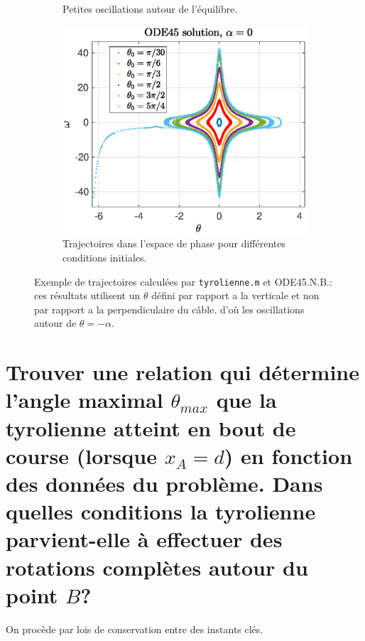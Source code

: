 \documentclass[11pt,a4paper]{exam}
\begin{document}
\begin{parts}
\begin{figure}
\begin{subfigure}{.45\textwidth}
      \caption{Petites oscillations autour de l'équilibre.}
        \label{fig:solution_petites_oscillations}
    \end{subfigure}%
    \begin{subfigure}{.55\textwidth}
      \centering
        \includegraphics[width=0.95\linewidth]{ExoFig/tyr_solution_espace_de_phase.eps}
      \caption{Trajectoires dans l'espace de phase pour différentes conditions initiales.}
        \label{fig:espace_phase}
    \end{subfigure}
    \caption{Exemple de trajectoires calculées par \texttt{tyrolienne.m} et ODE45.N.B.: ces résultats utilisent un $\theta$ défini par rapport a la verticale et non par rapport a la perpendiculaire du câble. d'où les oscillations autour de $\theta=-\alpha$.}
    \label{fig:test}
    \end{figure}



\part{Trouver une relation qui détermine l'angle maximal $\theta_{max}$ que la tyrolienne atteint en bout de course (lorsque $x_A=d$) en fonction des données du problème. 
Dans quelles conditions la tyrolienne parvient-elle à effectuer des rotations complètes autour du point $B$?}
    \par\vspace{2mm}
    On procède par lois de conservation entre des instants clés.

\end{parts}
\end{document}
